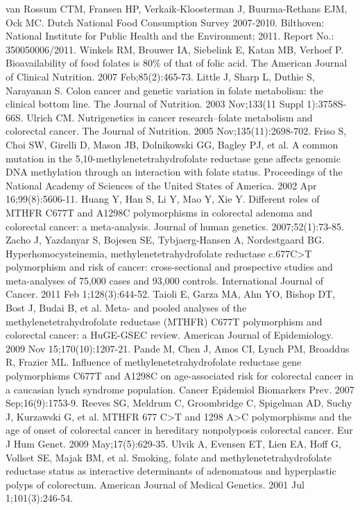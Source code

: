 \begin{thebibliography}{12}
		van Rossum CTM, Fransen HP, Verkaik-Kloosterman J, Buurma-Rethans EJM, Ock MC. Dutch National Food Consumption Survey 2007-2010. Bilthoven: National Institute for Public Health and the Environment; 2011. Report No.: 350050006/2011. 
		Winkels RM, Brouwer IA, Siebelink E, Katan MB, Verhoef P. Bioavailability of food folates is 80\% of that of folic acid. The American Journal of Clinical Nutrition. 2007 Feb;85(2):465-73. 
		Little J, Sharp L, Duthie S, Narayanan S. Colon cancer and genetic variation in folate metabolism: the clinical bottom line. The Journal of Nutrition. 2003 Nov;133(11 Suppl 1):3758S-66S. 
		Ulrich CM. Nutrigenetics in cancer research--folate metabolism and colorectal cancer. The Journal of Nutrition. 2005 Nov;135(11):2698-702. 
		Friso S, Choi SW, Girelli D, Mason JB, Dolnikowski GG, Bagley PJ, et al. A common mutation in the 5,10-methylenetetrahydrofolate reductase gene affects genomic DNA methylation through an interaction with folate status. Proceedings of the National Academy of Sciences of the United States of America. 2002 Apr 16;99(8):5606-11. 
		Huang Y, Han S, Li Y, Mao Y, Xie Y. Different roles of MTHFR C677T and A1298C polymorphisms in colorectal adenoma and colorectal cancer: a meta-analysis. Journal of human genetics. 2007;52(1):73-85. 
		Zacho J, Yazdanyar S, Bojesen SE, Tybjaerg-Hansen A, Nordestgaard BG. Hyperhomocysteinemia, methylenetetrahydrofolate reductase c.677C>T polymorphism and risk of cancer: cross-sectional and prospective studies and meta-analyses of 75,000 cases and 93,000 controls. International Journal of Cancer. 2011 Feb 1;128(3):644-52. 
		Taioli E, Garza MA, Ahn YO, Bishop DT, Bost J, Budai B, et al. Meta- and pooled analyses of the methylenetetrahydrofolate reductase (MTHFR) C677T polymorphism and colorectal cancer: a HuGE-GSEC review. American Journal of Epidemiology. 2009 Nov 15;170(10):1207-21. 
		Pande M, Chen J, Amos CI, Lynch PM, Broaddus R, Frazier ML. Influence of methylenetetrahydrofolate reductase gene polymorphisms C677T and A1298C on age-associated risk for colorectal cancer in a caucasian lynch syndrome population. Cancer Epidemiol Biomarkers Prev. 2007 Sep;16(9):1753-9. 
		Reeves SG, Meldrum C, Groombridge C, Spigelman AD, Suchy J, Kurzawski G, et al. MTHFR 677 C>T and 1298 A>C polymorphisms and the age of onset of colorectal cancer in hereditary nonpolyposis colorectal cancer. Eur J Hum Genet. 2009 May;17(5):629-35. 
		Ulvik A, Evensen ET, Lien EA, Hoff G, Vollset SE, Majak BM, et al. Smoking, folate and methylenetetrahydrofolate reductase status as interactive determinants of adenomatous and hyperplastic polyps of colorectum. American Journal of Medical Genetics. 2001 Jul 1;101(3):246-54. 

\end{thebibliography}
